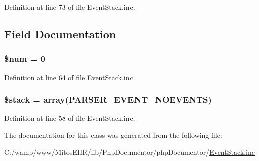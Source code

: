 \-Definition at line 73 of file \-Event\-Stack.\-inc.




\subsection{\-Field \-Documentation}
\hypertarget{class_event_stack_a606c9dff2aade84f01338c3c4cd8016b}{
\subsubsection[{\$num}]{\setlength{\rightskip}{0pt plus 5cm}\$num = 0}}\label{class_event_stack_a606c9dff2aade84f01338c3c4cd8016b}


\-Definition at line 64 of file \-Event\-Stack.\-inc.

\hypertarget{class_event_stack_a6a0169b26b5301f906b1ec481b3f1eea}{
\subsubsection[{\$stack}]{\setlength{\rightskip}{0pt plus 5cm}\$stack = array({\bf \-P\-A\-R\-S\-E\-R\-\_\-\-E\-V\-E\-N\-T\-\_\-\-N\-O\-E\-V\-E\-N\-T\-S})}}\label{class_event_stack_a6a0169b26b5301f906b1ec481b3f1eea}


\-Definition at line 58 of file \-Event\-Stack.\-inc.



\-The documentation for this class was generated from the following file\-:\begin{DoxyCompactItemize}
\item 
\-C\-:/wamp/www/\-Mitos\-E\-H\-R/lib/\-Php\-Documentor/php\-Documentor/\hyperlink{_event_stack_8inc}{\-Event\-Stack.\-inc}\end{DoxyCompactItemize}
